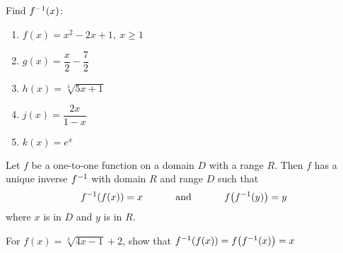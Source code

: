\documentclass[mathNotesPreamble]{subfiles}
\begin{document}
  \begin{ex*}
    Find $f^{-1}(x)$:
    \begin{enumerate}[label=, itemsep=50pt]
      \item $f(x)=x^2-2x+1,\ x\geq 1$
      \item $g(x)=\dfrac{x}{2}-\dfrac{7}{2}$
      \item $h(x)=\sqrt[3]{5x+1}$
      \item $j(x)=\dfrac{2x}{1-x}$
      \item $k(x)=e^x$
    \end{enumerate}
  \end{ex*}
  \pagebreak

  \begin{thmBox*}
    Let $f$ be a one-to-one function on a domain $D$ with a range $R$. Then $f$ has a unique inverse $f^{-1}$ with domain $R$ and range $D$ such that
    \[f^{-1}{\left(f(x)\right)}=x\hspace*{30pt}\text{ and }\hspace*{30pt}f{\left(f^{-1}(y)\right)}=y\]
  where $x$ is in $D$ and $y$ is in $R$.
  \end{thmBox*}
  \vspace*{15pt}

  \begin{ex*}
    For $f(x)=\sqrt[3]{4x-1}+2$, show that $f^{-1}{\left(f(x)\right)}=f{\left(f^{-1}(x)\right)}=x$
  \end{ex*}
  \pagebreak
\end{document}
